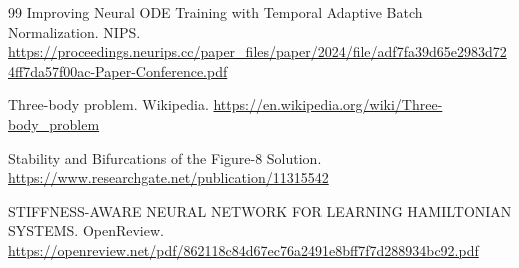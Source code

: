 \documentclass[11pt, a4paper]{article}
\begin{document}
\begin{thebibliography}{99}
 Improving Neural ODE Training with Temporal Adaptive Batch Normalization. NIPS. \url{https://proceedings.neurips.cc/paper_files/paper/2024/file/adf7fa39d65e2983d724ff7da57f00ac-Paper-Conference.pdf}

 Three-body problem. Wikipedia. \url{https://en.wikipedia.org/wiki/Three-body_problem}

 Stability and Bifurcations of the Figure-8 Solution. \url{https://www.researchgate.net/publication/11315542}

 STIFFNESS-AWARE NEURAL NETWORK FOR LEARNING HAMILTONIAN SYSTEMS. OpenReview. \url{https://openreview.net/pdf/862118c84d67ec76a2491e8bff7f7d288934bc92.pdf}

\end{thebibliography}
\end{document}
